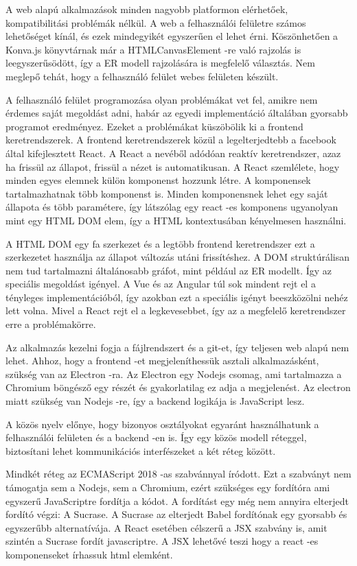 \documentclass[a4paper,12pt,oneside]{report}
\begin{document}
\begin{justify}

	A web alapú alkalmazások minden nagyobb platformon elérhetőek, kompatibilitási problémák nélkül. A web a felhasználói felületre számos lehetőséget kínál, és ezek mindegyikét egyszerűen el lehet érni. Köszönhetően a Konva.js könyvtárnak már a HTMLCanvasElement -re való rajzolás is leegyszerűsödött, így a ER modell rajzolására is megfelelő választás. Nem meglepő tehát, hogy a felhasználó felület webes felületen készült. 

	A felhasználó felület programozása olyan problémákat vet fel, amikre nem érdemes saját megoldást adni, habár az egyedi implementáció általában gyorsabb programot eredményez. Ezeket a problémákat küszöbölik ki a frontend keretrendszerek. A frontend keretrendszerek közül a legelterjedtebb a facebook által kifejlesztett React. A React a nevéből adódóan reaktív keretrendszer, azaz ha frissül az állapot, frissül a nézet is automatikusan. A React szemlélete, hogy minden egyes elemnek külön komponenst hozzunk létre. A komponensek tartalmazhatnak több komponenst is. Minden komponensnek lehet egy saját állapota és több paramétere, így látszólag egy react -es komponens ugyanolyan mint egy HTML DOM elem, így a HTML kontextusában kényelmesen használni.

	A HTML DOM egy fa szerkezet és a legtöbb frontend keretrendszer ezt a szerkezetet használja az állapot változás utáni frissítéshez. A DOM struktúrálisan nem tud tartalmazni általánosabb gráfot, mint például az ER modellt. Így az speciális megoldást igényel. A Vue és az Angular túl sok mindent rejt el a tényleges implementációból, így azokban ezt a speciális igényt beeszközölni nehéz lett volna. Mivel a React rejt el a legkevesebbet, így az a megfelelő keretrendszer erre a problémakörre.

	Az alkalmazás kezelni fogja a fájlrendszert és a git-et, így teljesen web alapú nem lehet. Ahhoz, hogy a frontend -et megjeleníthessük asztali alkalmazásként, szükség van az Electron -ra. Az Electron egy Nodejs csomag, ami tartalmazza a Chromium böngésző egy részét és gyakorlatilag ez adja a megjelenést. Az electron miatt szükség van Nodejs -re, így a backend logikája is JavaScript lesz.

	A közös nyelv előnye, hogy bizonyos osztályokat egyaránt használhatunk a felhasználói felületen és a backend -en is. Így egy közös modell réteggel, biztosítani lehet kommunikációs interfészeket a két réteg között. 

	Mindkét réteg az ECMAScript 2018 -as szabvánnyal íródott. Ezt a szabványt nem támogatja sem a Nodejs, sem a Chromium, ezért szükséges egy fordítóra ami egyszerű JavaScriptre fordítja a kódot. A fordítást egy még nem annyira elterjedt fordító végzi: A Sucrase. A Sucrase az elterjedt Babel fordítónak egy gyorsabb és egyszerűbb alternatívája. A React esetében célszerű a JSX szabvány is, amit szintén a Sucrase fordít javascriptre. A JSX lehetővé teszi hogy a react -es komponenseket írhassuk html elemként.


\end{justify}
\newpage
\end{document}

